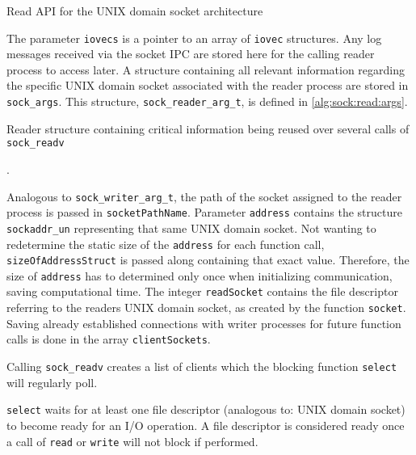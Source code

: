 \begin{algorithm}[h!]
    
    \caption[Socket: Read \ac{API}]{Read \ac{API} for the UNIX domain socket architecture}
    \label{alg:sock:read}
\end{algorithm}

The parameter \texttt{iovecs} is a pointer to an array of \texttt{iovec} structures.
Any log messages received via the socket \ac{IPC} are stored here for the calling reader process to access later.
A structure containing all relevant information regarding the specific UNIX domain socket associated with the reader process are stored in \texttt{sock\_args}.
This structure, \texttt{sock\_reader\_arg\_t}, is defined in \ref{alg:sock:read:args}.

\begin{algorithm}[h!]
    
    \caption[Socket: Reader structure]{Reader structure containing critical information being reused over several calls of \texttt{sock\_readv}}.
    \label{alg:sock:read:args}
\end{algorithm}

Analogous to \texttt{sock\_writer\_arg\_t}, the path of the socket assigned to the reader process is passed in \texttt{socketPathName}.
Parameter \texttt{address} contains the structure \texttt{sockaddr\_un} representing that same UNIX domain socket.
Not wanting to redetermine the static size of the \texttt{address} for each function call, \texttt{sizeOfAddressStruct} is passed along containing that exact value.
Therefore, the size of \texttt{address} has to determined only once when initializing communication, saving computational time.
The integer \texttt{readSocket} contains the file descriptor referring to the readers UNIX domain socket, as created by the function \texttt{socket}.
Saving already established connections with writer processes for future function calls is done in the array \texttt{clientSockets}.

Calling \texttt{sock\_readv} creates a list of clients which the blocking function \texttt{select} will regularly poll.

\texttt{select} waits for at least one file descriptor (analogous to: UNIX domain socket) to become ready for an I/O operation.
A file descriptor is considered ready once a call of \texttt{read} or \texttt{write} will not block if performed.\cite{man:select}


